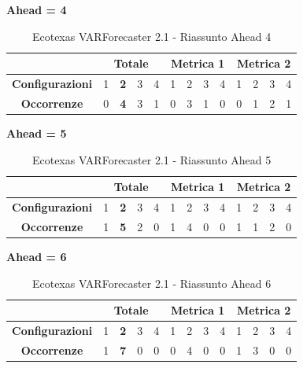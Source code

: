 \documentclass[12pt,a4paper,oneside,openright]{book}
\begin{document}
\medskip
\textbf{Ahead = 4}


\begin{table}[H]
\centering
\begin{tabular}{|c|c|c|c|c|c|c|c|c|c|c|c|c|}
\hline
 & \multicolumn{4}{|c|}{\textbf{Totale}} & \multicolumn{4}{|c|}{\textbf{Metrica 1}} & \multicolumn{4}{|c|}{\textbf{Metrica 2}} \\
\hline
\textbf{Configurazioni} & 1 & \textbf{2} & 3 & 4 & 1 & 2 & 3 & 4 & 1 & 2 & 3 & 4 \\
\hline
\textbf{Occorrenze} & 0 & \textbf{4} & 3 & 1 & 0 & 3 & 1 & 0 & 0 & 1 & 2 & 1\\
\hline
\end{tabular}
\caption{Ecotexas VARForecaster 2.1 - Riassunto Ahead 4}
\end{table}

\medskip
\textbf{Ahead = 5}


\begin{table}[H]
\centering
\begin{tabular}{|c|c|c|c|c|c|c|c|c|c|c|c|c|}
\hline
 & \multicolumn{4}{|c|}{\textbf{Totale}} & \multicolumn{4}{|c|}{\textbf{Metrica 1}} & \multicolumn{4}{|c|}{\textbf{Metrica 2}} \\
\hline
\textbf{Configurazioni} & 1 & \textbf{2} & 3 & 4 & 1 & 2 & 3 & 4 & 1 & 2 & 3 & 4 \\
\hline
\textbf{Occorrenze} & 1 & \textbf{5} & 2 & 0 & 1 & 4 & 0 & 0 & 1 & 1 & 2 & 0\\
\hline
\end{tabular}
\caption{Ecotexas VARForecaster 2.1 - Riassunto Ahead 5}
\end{table}

\medskip
\textbf{Ahead = 6}


\begin{table}[H]
\centering
\begin{tabular}{|c|c|c|c|c|c|c|c|c|c|c|c|c|}
\hline
 & \multicolumn{4}{|c|}{\textbf{Totale}} & \multicolumn{4}{|c|}{\textbf{Metrica 1}} & \multicolumn{4}{|c|}{\textbf{Metrica 2}} \\
\hline
\textbf{Configurazioni} & 1 & \textbf{2} & 3 & 4 & 1 & 2 & 3 & 4 & 1 & 2 & 3 & 4 \\
\hline
\textbf{Occorrenze} & 1 & \textbf{7} & 0 & 0 & 0 & 4 & 0 & 0 & 1 & 3 & 0 & 0\\
\hline
\end{tabular}
\caption{Ecotexas VARForecaster 2.1 - Riassunto Ahead 6}
\end{table} 
\end{document}
